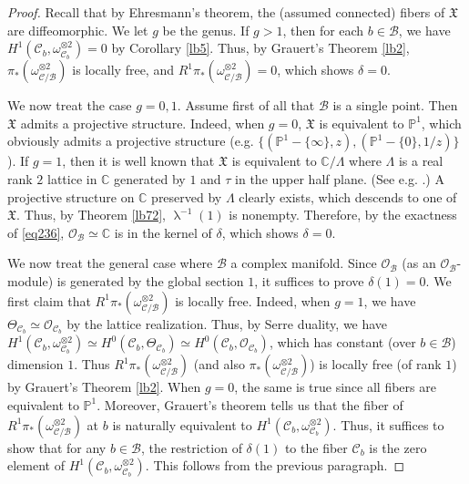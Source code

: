 \documentclass[12pt,a4paper,notitlepage]{report}
\theoremstyle{definition}
\theoremstyle{plain}
\newcommand{\fk}{\mathfrak}
\newcommand{\mc}{\mathcal}
\newcommand{\scr}{\mathscr}
\newcommand{\Cbb}{\mathbb C}
\newcommand{\Pbb}{\mathbb P}
\numberwithin{equation}{section}
\begin{document}
\begin{proof}
Recall that by Ehresmann's theorem, the (assumed connected) fibers of $\fk X$ are diffeomorphic. We let $g$ be the genus. If $g>1$, then for each $b\in\mc B$, we have $H^1(\mc C_b,\omega_{\mc C_b}^{\otimes 2})=0$ by Corollary \ref{lb5}. Thus, by Grauert's Theorem \ref{lb2}, $\pi_*(\omega_{\mc C/\mc B}^{\otimes 2})$ is locally free, and  $R^1\pi_*(\omega_{\mc C/\mc B}^{\otimes 2})=0$, which shows $\delta=0$.

We now treat the case $g=0,1$. Assume first of all that $\mc B$ is a single point. Then $\fk X$ admits a projective structure.  Indeed, when $g=0$, $\fk X$ is equivalent to $\Pbb^1$, which obviously admits a projective structure (e.g. $\{(\Pbb^1-\{\infty\},z),(\Pbb^1-\{0\},1/z)\}$). If $g=1$, then it is well known that $\fk X$ is equivalent to $\Cbb/\Lambda$ where $\Lambda$ is a real rank $2$ lattice in $\Cbb$ generated by $1$ and $\tau$ in the upper half plane. (See e.g. \cite{Hain08}.) A projective structure on $\Cbb$ preserved by $\Lambda$ clearly exists, which descends to one of $\fk X$. Thus, by Theorem \ref{lb72}, $\uplambda^{-1}(1)$ is nonempty. Therefore, by the exactness of \eqref{eq236}, $\scr O_{\mc B}\simeq \Cbb$ is in the kernel of $\delta$, which shows $\delta=0$.



We now treat the general case where $\mc B$ a complex manifold. Since $\scr O_{\mc B}$ (as an $\scr O_{\mc B}$-module) is generated by the global section $1$, it suffices to prove $\delta(1)=0$.  We first claim that $R^1\pi_*(\omega_{\mc C/\mc B}^{\otimes 2})$ is locally free. Indeed,  when $g=1$, we have $\Theta_{\mc C_b}\simeq\scr O_{\mc C_b}$ by the lattice realization. Thus, by Serre duality, we have $H^1(\mc C_b,\omega_{\mc C_b}^{\otimes 2})\simeq H^0(\mc C_b,\Theta_{\mc C_b})\simeq H^0(\mc C_b,\scr O_{\mc C_b})$, which has constant (over $b\in\mc B$) dimension $1$. Thus $R^1\pi_*(\omega_{\mc C/\mc B}^{\otimes 2})$ (and also $\pi_*(\omega_{\mc C/\mc B}^{\otimes 2})$) is locally free (of rank $1$) by Grauert's Theorem \ref{lb2}. When $g=0$, the same is true since all fibers are equivalent to $\Pbb^1$. Moreover, Grauert's theorem tells us that the fiber of $R^1\pi_*(\omega_{\mc C/\mc B}^{\otimes 2})$ at $b$ is naturally equivalent to $H^1(\mc C_b,\omega_{\mc C_b}^{\otimes 2})$. Thus, it suffices to show that for any $b\in\mc B$, the restriction of $\delta(1)$ to the fiber $\mc C_b$ is the zero element of $H^1(\mc C_b,\omega_{\mc C_b}^{\otimes 2})$. This follows from the previous paragraph.
\end{proof}
\end{document}
